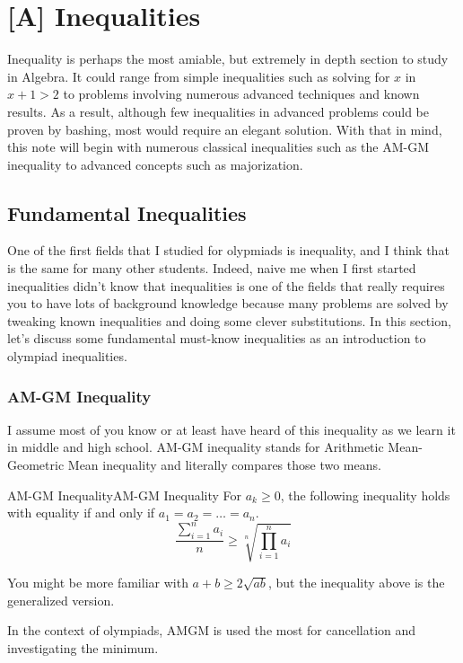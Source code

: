 \documentclass[../../main.tex]{subfiles}
\begin{document}
\chapter{[A] Inequalities}

Inequality is perhaps the most amiable, but extremely in depth
section to study in Algebra. It could range from simple inequalities
such as solving for $x$ in $x + 1 > 2$ to problems involving
numerous advanced techniques and known results. As a result,
although few inequalities in advanced problems could be proven by
bashing, most would require an elegant solution. With that in mind,
this note will begin with numerous classical inequalities such as
the AM-GM inequality to advanced concepts such as majorization.

\section{Fundamental Inequalities}

One of the first fields that I studied for olypmiads is inequality,
and I think that is the same for many other students. Indeed,
naive me when I first started inequalities didn't know that
inequalities is one of the fields that really requires you to have
lots of background knowledge because many problems are solved
by tweaking known inequalities and doing some clever substitutions.
In this section, let's discuss some fundamental must-know inequalities
as an introduction to olympiad inequalities.

\subsection{AM-GM Inequality}

I assume most of you know or at least have heard of this inequality
as we learn it in middle and high school. AM-GM inequality stands
for Arithmetic Mean-Geometric Mean inequality and literally compares
those two means.

\begin{definition}{AM-GM Inequality}{AM-GM Inequality}
For $a_k \geq 0$, the following inequality holds with equality if
and only if $a_1 = a_2 = \dots = a_n$.
\[
\frac{ \sum_{i=1}^n a_i }{n} \geq
\sqrt[n]{ \prod_{i=1}^n a_i }
\]
\end{definition}

You might be more familiar with $a + b \geq 2 \sqrt{ab}$, but the
inequality above is the generalized version.

\begin{important}
In the context of olympiads, AMGM is used the most for cancellation
and investigating the minimum.
\end{important}
\end{document}
